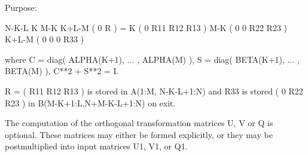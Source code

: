 \begin{DoxyParagraph}{Purpose\+: }
\begin{DoxyVerb}
                N-K-L  K   M-K  K+L-M
 ( 0 R ) =    K ( 0    R11  R12  R13  )
           M-K ( 0     0   R22  R23  )
         K+L-M ( 0     0    0   R33  )

 where
 C = diag( ALPHA(K+1), ... , ALPHA(M) ),
 S = diag( BETA(K+1),  ... , BETA(M) ),
 C**2 + S**2 = I.

 R = ( R11 R12 R13 ) is stored in A(1:M, N-K-L+1:N) and R33 is stored
     (  0  R22 R23 )
 in B(M-K+1:L,N+M-K-L+1:N) on exit.

 The computation of the orthogonal transformation matrices U, V or Q
 is optional.  These matrices may either be formed explicitly, or they
 may be postmultiplied into input matrices U1, V1, or Q1.\end{DoxyVerb}
 
\end{DoxyParagraph}

